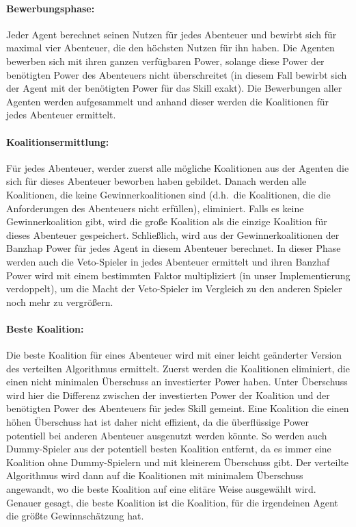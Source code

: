 \documentclass[fleqn,10pt]{article} %
\begin{document}
\paragraph{Bewerbungsphase:}
Jeder Agent berechnet seinen Nutzen für jedes Abenteuer und bewirbt sich für maximal vier Abenteuer, die den höchsten Nutzen für ihn haben. Die Agenten bewerben sich mit ihren ganzen verfügbaren Power, solange diese Power der benötigten Power des Abenteuers nicht überschreitet (in diesem Fall bewirbt sich der Agent mit der benötigten Power für das Skill exakt).  Die Bewerbungen aller Agenten werden aufgesammelt und anhand dieser werden die Koalitionen für jedes Abenteuer ermittelt. 

\paragraph{Koalitionsermittlung:}
Für jedes Abenteuer, werder zuerst alle mögliche Koalitionen aus der Agenten die sich für dieses Abenteuer beworben haben gebildet. Danach werden alle Koalitionen, die keine Gewinnerkoalitionen sind (d.h.\ die Koalitionen, die die Anforderungen des Abenteuers nicht erfüllen), eliminiert. Falls es keine Gewinnerkoalition gibt, wird die große Koalition als die einzige Koalition für dieses Abenteuer gespeichert. Schließlich, wird aus der Gewinnerkoalitionen der Banzhap Power für jedes Agent in diesem Abenteuer berechnet. In dieser Phase werden auch die Veto-Spieler in jedes Abenteuer ermittelt und ihren Banzhaf Power wird mit einem bestimmten Faktor multipliziert (in unser Implementierung verdoppelt), um die Macht der Veto-Spieler im Vergleich zu den anderen Spieler noch mehr zu vergrößern. 

\paragraph{Beste Koalition:}
Die beste Koalition für eines Abenteuer wird mit einer leicht geänderter Version des verteilten Algorithmus ermittelt. Zuerst werden die Koalitionen eliminiert, die einen nicht minimalen Überschuss an investierter Power haben. Unter Überschuss wird hier die Differenz zwischen der investierten Power der Koalition und der benötigten Power des Abenteuers für jedes Skill gemeint. Eine Koalition die einen höhen Überschuss hat ist daher nicht effizient, da die überflüssige Power potentiell bei anderen Abenteuer ausgenutzt werden könnte. So werden auch Dummy-Spieler aus der potentiell besten Koalition entfernt, da es immer eine Koalition ohne Dummy-Spielern und mit kleinerem Überschuss gibt. Der verteilte Algorithmus wird dann auf die Koalitionen mit minimalem Überschuss angewandt, wo die beste Koalition auf eine elitäre Weise ausgewählt wird. Genauer gesagt, die beste Koalition ist die Koalition, für die irgendeinen Agent die größte Gewinnschätzung hat.
\end{document}
